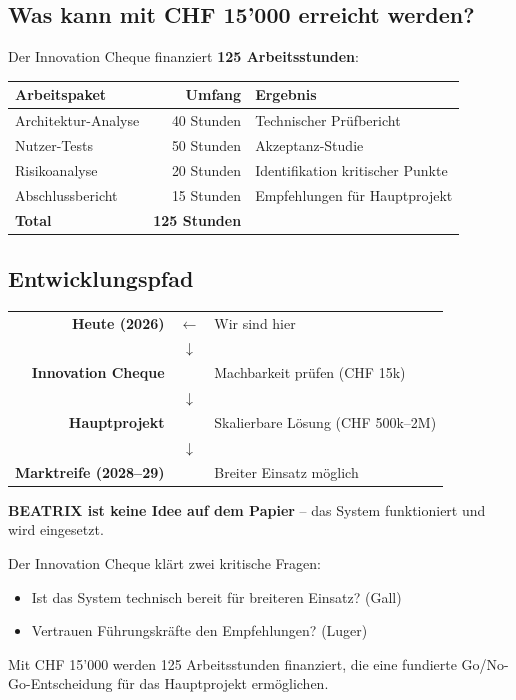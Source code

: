 \documentclass[11pt,a4paper]{article}
\begin{document}
\subsection{Was kann mit CHF 15'000 erreicht werden?}

Der Innovation Cheque finanziert \textbf{125 Arbeitsstunden}:

\begin{table}[h]
\centering
\begin{tabular}{lrl}
\toprule
\textbf{Arbeitspaket} & \textbf{Umfang} & \textbf{Ergebnis} \\
\midrule
Architektur-Analyse & 40 Stunden & Technischer Prüfbericht \\
Nutzer-Tests & 50 Stunden & Akzeptanz-Studie \\
Risikoanalyse & 20 Stunden & Identifikation kritischer Punkte \\
Abschlussbericht & 15 Stunden & Empfehlungen für Hauptprojekt \\
\midrule
\textbf{Total} & \textbf{125 Stunden} & \\
\bottomrule
\end{tabular}
\end{table}

\subsection{Entwicklungspfad}

\begin{center}
\begin{tabular}{rcl}
\textbf{Heute (2026)} & $\leftarrow$ & Wir sind hier \\
& $\downarrow$ & \\
\textbf{Innovation Cheque} & & Machbarkeit prüfen (CHF 15k) \\
& $\downarrow$ & \\
\textbf{Hauptprojekt} & & Skalierbare Lösung (CHF 500k--2M) \\
& $\downarrow$ & \\
\textbf{Marktreife (2028--29)} & & Breiter Einsatz möglich \\
\end{tabular}
\end{center}

\begin{summarybox}
\textbf{BEATRIX ist keine Idee auf dem Papier} -- das System funktioniert und wird eingesetzt.

Der Innovation Cheque klärt zwei kritische Fragen:
\begin{itemize}[noitemsep]
    \item Ist das System technisch bereit für breiteren Einsatz? (Gall)
    \item Vertrauen Führungskräfte den Empfehlungen? (Luger)
\end{itemize}

Mit CHF 15'000 werden 125 Arbeitsstunden finanziert, die eine fundierte Go/No-Go-Entscheidung für das Hauptprojekt ermöglichen.
\end{summarybox}
\end{document}
